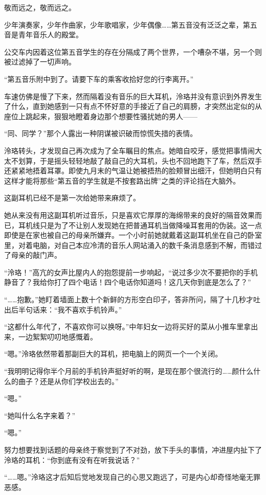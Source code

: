 \documentclass[UTF8, scheme = chinese, openany]{ctexbook}
\begin{document}
敬而远之，敬而远之。

少年演奏家，少年作曲家，少年歌唱家，少年偶像……第五音没有泛泛之辈，第五音是青年音乐人的殿堂。

公交车内因着这位第五音学生的存在分隔成了两个世界，一个嘈杂不堪，另一个则被过滤掉了一切声响。

“第五音乐附中到了。请要下车的乘客收拾好您的行李离开。”

车速仿佛是慢了下来，然而隔着没有音乐的巨大耳机，泠珞并没有意识到外界发生了什么，直到她感到一只有点不怀好意的手接近了自己的肩膀，才突然出定似的从座位上跳起来，狠狠地瞪着身边那个想要性骚扰她的男人——

“同、同学？”那个人露出一种阴谋被识破而惊慌失措的表情。

泠珞转头，才发现自己再次成为了全车瞩目的焦点。她暗自咬牙，感觉把事情闹大太不划算，于是摇头轻轻地敲了敲自己的大耳机，头也不回地跑下了车，然后双手还紧紧地捂着耳罩。即使九月末的气温让她被捂热的脸颊冒出细汗，但她明白只有这样才能将那些“第五音的学生就是不按套路出牌”之类的评论挡在大脑外。

这副耳机已经不是第一次给她带来麻烦了。

她从来没有用这副耳机听过音乐，只是喜欢它厚厚的海绵带来的良好的隔音效果而已，耳机线只是为了不让别人发现她在把普通耳机当做降噪耳套用的伪装。这一点即使是在家也被自己的母亲所嫌弃。一个小时前她就戴着这副耳机坐在自己的卧室里，对着电脑，对自己本应冷清的音乐人网站涌入的数千条消息感到不解，而错过了母亲的敲门声。

“泠珞！”高亢的女声比屋内人的抱怨提前一步响起，“说过多少次不要把你的手机静音了？我给你打了四个电话！四个电话你知道吗！这几天你到底是怎么了？”

“……抱歉。”她盯着墙面上数十个新鲜的方形空白印子，答非所问，隔了十几秒才吐出后半句话来：“我不喜欢手机铃声。”

“这都什么年代了，不喜欢你可以换呀。”中年妇女一边将买好的菜从小推车里拿出来，一边絮絮叨叨地感慨着。

“嗯。”泠珞依然带着那副巨大的耳机，把电脑上的网页一个一个关闭。

“我明明记得你半个月前的手机铃声挺好听的啊，是现在那个很流行的……颜什么什么的曲子？还是从你们学校出去的。”

“嗯。”

“她叫什么名字来着？”

“嗯。”

努力想要找到话题的母亲终于察觉到了不对劲，放下手头的事情，冲进屋内扯下了泠珞的耳机：“你到底有没有在听我说话？”

“……嗯。”泠珞这才后知后觉地发现自己的心思又跑远了，可是内心却奇怪地毫无罪恶感。
\end{document}
